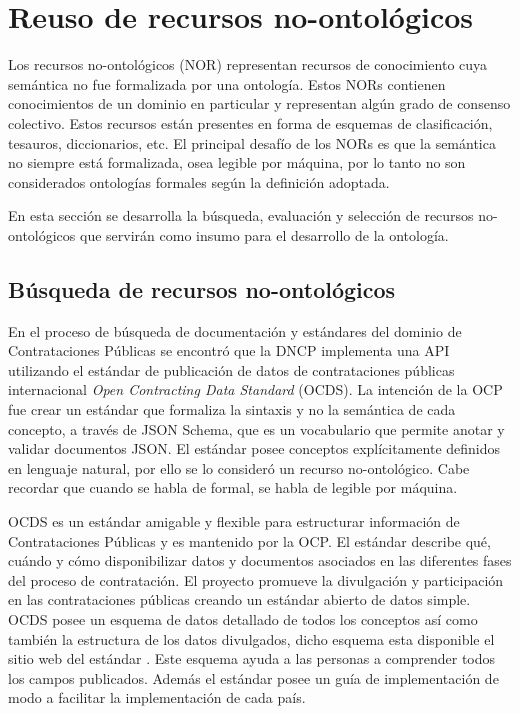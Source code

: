 
\section{Reuso de recursos no-ontológicos}
Los recursos no-ontológicos (NOR)\cite{ReusoRecursoNoOntologico} representan recursos de conocimiento cuya semántica no fue formalizada por una ontología. Estos NORs contienen conocimientos de un dominio en particular y representan algún grado de consenso colectivo. Estos recursos están presentes en forma de esquemas de clasificación, tesauros, diccionarios, etc. El principal desafío de los NORs es que la semántica no siempre está formalizada, osea legible por máquina, por lo tanto no son considerados ontologías formales según la definición adoptada.

En esta sección se desarrolla la búsqueda, evaluación y selección de recursos no-ontológicos que servirán como insumo para el desarrollo de la ontología.

\subsection{Búsqueda de recursos no-ontológicos }

En el proceso de búsqueda de documentación y estándares del dominio de Contrataciones Públicas se encontró que la DNCP implementa una API utilizando el estándar de publicación de datos de contrataciones públicas internacional \textit{Open Contracting Data Standard} (OCDS). La intención de la OCP fue crear un estándar que formaliza la sintaxis y no la semántica de cada concepto, a través de JSON Schema\cite{JSONSche10:online}, que es un vocabulario que permite anotar y validar documentos JSON. El estándar posee conceptos explícitamente definidos en lenguaje natural, por ello se lo consideró un recurso no-ontológico. Cabe recordar que cuando se habla de formal, se habla de legible por máquina. 

OCDS es un estándar amigable y flexible para estructurar información de Contrataciones Públicas y es mantenido por la OCP. El estándar describe qué, cuándo y cómo disponibilizar datos y documentos asociados en las diferentes fases del proceso de contratación. El proyecto promueve la divulgación y participación en las contrataciones públicas creando un estándar abierto de datos simple. OCDS posee un esquema de datos detallado de todos los conceptos así como también la estructura de los datos divulgados, dicho esquema esta disponible el sitio web del estándar \cite{OCDSReleaseSchema:online}. Este esquema ayuda a las personas a comprender todos los campos publicados. Además el estándar posee un guía de implementación de modo a facilitar la implementación de cada país.

